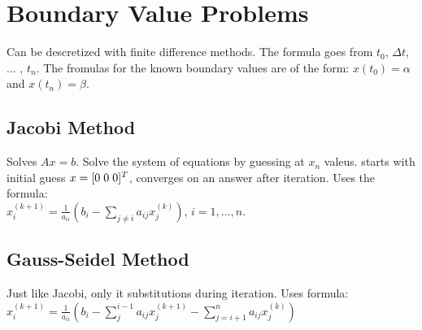 \section{Boundary Value Problems}
Can be descretized with finite difference methods.
The formula goes from $t_0$, $\Delta t$, ... , $t_n$.
The fromulas for the known boundary values are of the
form: $x(t_0) = \alpha$ and $x(t_n) = \beta$.

\subsection*{Jacobi Method}
Solves $Ax = b$. Solve the system of equations by guessing at $x_n$ valeus.
starts with initial guess $x = [0 \hspace{1mm} 0 \hspace{1mm} 0]^T$,
converges on an answer after iteration. Uses the formula:\\
$x_i^{(k+1)} = \frac{1}{a_{ii}}(b_i - \sum_{j \neq i} a_{ij} x_j^{(k)})$, $i = 1, ..., n$.

\subsection*{Gauss-Seidel Method}
Just like Jacobi, only it substitutions during iteration. Uses formula:
$x_i^{(k+1)} = \frac{1}{a_{ii}}(b_i - \sum_{j}^{i-1} a_{ij} x_j^{(k+1)} - \sum_{j=i+1}^n a_{ij} x_j^{(k)} )$
